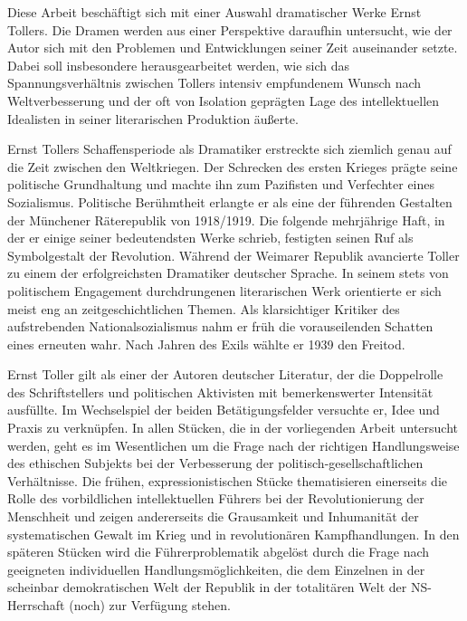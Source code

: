 

Diese Arbeit beschäftigt sich mit einer Auswahl dramatischer Werke Ernst
Tollers. Die Dramen werden aus einer  Perspektive
daraufhin untersucht, wie der Autor sich mit den Problemen und Entwicklungen
seiner Zeit auseinander setzte. Dabei soll insbesondere herausgearbeitet
werden, wie sich das Spannungsverhältnis zwischen Tollers intensiv empfundenem
Wunsch nach Weltverbesserung und der oft von Isolation geprägten Lage des
intellektuellen Idealisten in seiner literarischen Produktion äußerte.

Ernst Tollers Schaffensperiode als Dramatiker erstreckte sich ziemlich genau
auf die Zeit zwischen den Weltkriegen. Der Schrecken des ersten Krieges prägte
seine politische Grundhaltung und machte ihn zum Pazifisten und Verfechter
eines  Sozialismus. Politische Berühmtheit erlangte er als eine der
führenden Gestalten der Münchener Räterepublik von 1918/1919. Die folgende
mehrjährige Haft, in der er einige seiner bedeutendsten Werke schrieb,
festigten seinen Ruf als Symbolgestalt der Revolution. Während der Weimarer
Republik avancierte Toller zu einem der erfolgreichsten Dramatiker deutscher
Sprache.
In seinem stets von politischem Engagement durchdrungenen literarischen
Werk orientierte er sich meist eng an zeitgeschichtlichen Themen. Als
klarsichtiger Kritiker des aufstrebenden Nationalsozialismus nahm er früh die
vorauseilenden Schatten eines erneuten \Cite{Erdgemetzels} 
wahr. Nach Jahren des Exils wählte er 1939 den Freitod.

Ernst Toller gilt als einer der \Cite{engagierten}  Autoren deutscher
Literatur, der die Doppelrolle des Schriftstellers und politischen Aktivisten
mit bemerkenswerter Intensität ausfüllte. Im Wechselspiel der beiden
Betätigungsfelder versuchte er, Idee und Praxis zu verknüpfen.
In allen Stücken, die in der vorliegenden Arbeit untersucht werden, geht es 
im Wesentlichen um die Frage nach der richtigen Handlungsweise des ethischen
Subjekts bei der Verbesserung der politisch-gesellschaftlichen Verhältnisse. 
Die frühen, expressionistischen Stücke thematisieren einerseits die Rolle des
vorbildlichen intellektuellen Führers bei der Revolutionierung der Menschheit
und zeigen andererseits die Grausamkeit und Inhumanität der systematischen
Gewalt im Krieg und in revolutionären Kampfhandlungen. 
In den späteren Stücken wird die Führerproblematik abgelöst durch die Frage
nach geeigneten individuellen Handlungsmöglichkeiten, die dem Einzelnen in der
scheinbar demokratischen Welt der Republik  in der totalitären
Welt der NS-Herrschaft (noch) zur Verfügung stehen. 

